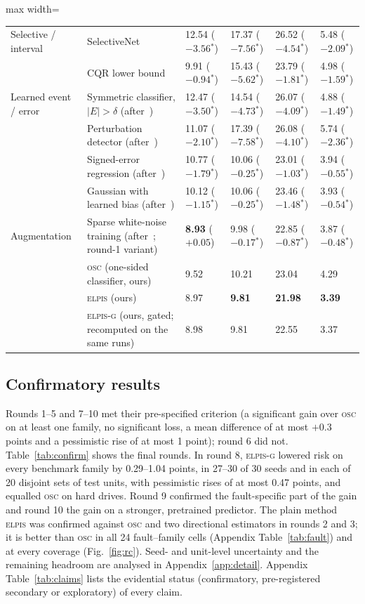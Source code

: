 \documentclass{esannV2}
\newcommand{\OSC}{\textsc{osc}}
\newcommand{\RPT}{\textsc{elpis}}
\newcommand{\AUTOD}{\textsc{elpis-g}}
\newcommand{\s}{$^{\ast}$}
\begin{document}
\begin{table}[!htbp]
\begin{adjustbox}{max width=\textwidth}
\begin{tabular}{llllll}
Selective / interval & SelectiveNet~\cite{geifman2019selectivenet} & 12.54 ($-3.56$\s) & 17.37 ($-7.56$\s) & 26.52 ($-4.54$\s) & 5.48 ($-2.09$\s)\\
 & CQR lower bound~\cite{romano2019cqr} & 9.91 ($-0.94$\s) & 15.43 ($-5.62$\s) & 23.79 ($-1.81$\s) & 4.98 ($-1.59$\s)\\
Learned event / error & Symmetric classifier, $|E|>\delta$ (after~\cite{corbiere2019addressing,kamath2020selective}) & 12.47 ($-3.50$\s) & 14.54 ($-4.73$\s) & 26.07 ($-4.09$\s) & 4.88 ($-1.49$\s)\\
 & Perturbation detector (after~\cite{isermann2005model}) & 11.07 ($-2.10$\s) & 17.39 ($-7.58$\s) & 26.08 ($-4.10$\s) & 5.74 ($-2.36$\s)\\
 & Signed-error regression (after~\cite{yoo2019learning}) & 10.77 ($-1.79$\s) & 10.06 ($-0.25$\s) & 23.01 ($-1.03$\s) & 3.94 ($-0.55$\s)\\
 & Gaussian with learned bias (after~\cite{nix1994estimating}) & 10.12 ($-1.15$\s) & 10.06 ($-0.25$\s) & 23.46 ($-1.48$\s) & 3.93 ($-0.54$\s)\\
Augmentation & Sparse white-noise training (after~\cite{bishop1995training}; round-1 variant) & \textbf{8.93} ($+0.05$) & 9.98 ($-0.17$\s) & 22.85 ($-0.87$\s) & 3.87 ($-0.48$\s)\\
 & \OSC{} (one-sided classifier, ours) & 9.52 & 10.21 & 23.04 & 4.29\\
\midrule
 & \RPT{} (ours) & 8.97 & \textbf{9.81} & \textbf{21.98} & \textbf{3.39}\\
 & \AUTOD{} (ours, gated; recomputed on the same runs) & 8.98 & 9.81 & 22.55 & 3.37\\
\bottomrule
\end{tabular}\end{adjustbox}
\end{table}


\FloatBarrier
\subsection{Confirmatory results}
Rounds 1--5 and 7--10 met their pre-specified criterion (a significant gain over \OSC{} on at least one family, no significant loss, a mean difference of at most $+0.3$ points and a pessimistic rise of at most 1 point); round 6 did not. Table~\ref{tab:confirm} shows the final rounds. In round 8, \AUTOD{} lowered risk on every benchmark family by 0.29--1.04 points, in 27--30 of 30 seeds and in each of 20 disjoint sets of test units, with pessimistic rises of at most 0.47 points, and equalled \OSC{} on hard drives. Round 9 confirmed the fault-specific part of the gain and round 10 the gain on a stronger, pretrained predictor. The plain method \RPT{} was confirmed against \OSC{} and two directional estimators in rounds 2 and 3; it is better than \OSC{} in all 24 fault--family cells (Appendix Table~\ref{tab:fault}) and at every coverage (Fig.~\ref{fig:rc}). Seed- and unit-level uncertainty and the remaining headroom are analysed in Appendix~\ref{app:detail}. Appendix Table~\ref{tab:claims} lists the evidential status (confirmatory, pre-registered secondary or exploratory) of every claim.
\end{document}
